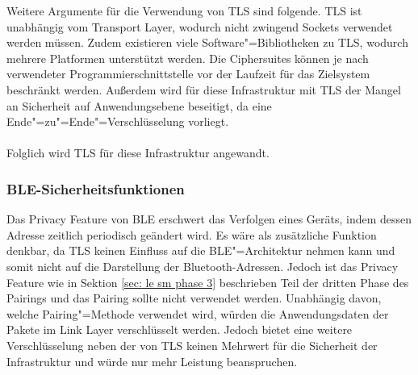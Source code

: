 Weitere Argumente für die Verwendung von TLS sind folgende. TLS ist unabhängig vom Transport Layer, wodurch nicht zwingend Sockets verwendet werden müssen. Zudem existieren viele Software"=Bibliotheken zu TLS, wodurch mehrere Platformen unterstützt werden. Die Ciphersuites können je nach verwendeter Programmierschnittstelle vor der Laufzeit für das Zielsystem beschränkt werden. Außerdem wird für diese Infrastruktur mit TLS der Mangel an Sicherheit auf Anwendungsebene beseitigt, da eine Ende"=zu"=Ende"=Verschlüsselung vorliegt. %
\\\\
Folglich wird TLS für diese Infrastruktur angewandt.

\subsubsection{BLE-Sicherheitsfunktionen}
\label{sec: infra sicherheit ble funktionen}
Das Privacy Feature von BLE erschwert das Verfolgen eines Geräts, indem dessen Adresse zeitlich periodisch geändert wird. Es wäre als zusätzliche Funktion denkbar, da TLS keinen Einfluss auf die BLE"=Architektur nehmen kann und somit nicht auf die Darstellung der Bluetooth-Adressen. Jedoch ist das Privacy Feature wie in Sektion \ref{sec: le sm phase 3} beschrieben Teil der dritten Phase des Pairings und das Pairing sollte nicht verwendet werden. Unabhängig davon, welche Pairing"=Methode verwendet wird, würden die Anwendungsdaten der Pakete im Link Layer verschlüsselt werden. Jedoch bietet eine weitere Verschlüsselung neben der von TLS keinen Mehrwert für die Sicherheit der Infrastruktur und würde nur mehr Leistung beanspruchen.